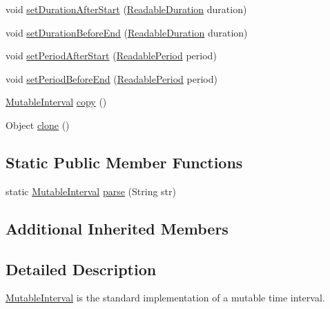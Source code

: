 \begin{DoxyCompactItemize}
\item 
void \hyperlink{classorg_1_1joda_1_1time_1_1_mutable_interval_ab1f299bcbd26ccd83659f46c922bef58}{set\-Duration\-After\-Start} (\hyperlink{interfaceorg_1_1joda_1_1time_1_1_readable_duration}{Readable\-Duration} duration)
\item 
void \hyperlink{classorg_1_1joda_1_1time_1_1_mutable_interval_a548d9b249b91368d4e212315a1bb6746}{set\-Duration\-Before\-End} (\hyperlink{interfaceorg_1_1joda_1_1time_1_1_readable_duration}{Readable\-Duration} duration)
\item 
void \hyperlink{classorg_1_1joda_1_1time_1_1_mutable_interval_af2d249047a6b1b0dddb7c43a6b897a59}{set\-Period\-After\-Start} (\hyperlink{interfaceorg_1_1joda_1_1time_1_1_readable_period}{Readable\-Period} period)
\item 
void \hyperlink{classorg_1_1joda_1_1time_1_1_mutable_interval_abfee38d02efa11147844509f737d4805}{set\-Period\-Before\-End} (\hyperlink{interfaceorg_1_1joda_1_1time_1_1_readable_period}{Readable\-Period} period)
\item 
\hyperlink{classorg_1_1joda_1_1time_1_1_mutable_interval}{Mutable\-Interval} \hyperlink{classorg_1_1joda_1_1time_1_1_mutable_interval_ad1596fc79bed04b163cb5542050c8997}{copy} ()
\item 
Object \hyperlink{classorg_1_1joda_1_1time_1_1_mutable_interval_a54dc766687406978bb2343e183a0dbd9}{clone} ()
\end{DoxyCompactItemize}
\subsection*{Static Public Member Functions}
\begin{DoxyCompactItemize}
\item 
static \hyperlink{classorg_1_1joda_1_1time_1_1_mutable_interval}{Mutable\-Interval} \hyperlink{classorg_1_1joda_1_1time_1_1_mutable_interval_ab329112a01966793cbcb76ca125b510d}{parse} (String str)
\end{DoxyCompactItemize}
\subsection*{Additional Inherited Members}


\subsection{Detailed Description}
\hyperlink{classorg_1_1joda_1_1time_1_1_mutable_interval}{Mutable\-Interval} is the standard implementation of a mutable time interval. 

